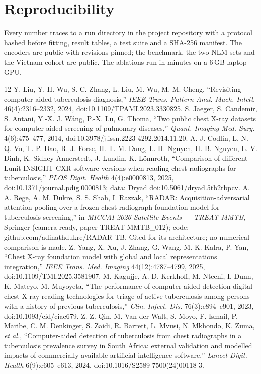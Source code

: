 \documentclass[11pt,a4paper]{article}
\begin{document}
\section*{Reproducibility}
Every number traces to a run directory in the project repository with a protocol hashed before fitting, result tables, a test suite and a SHA-256 manifest. The encoders are public with revisions pinned; the benchmark, the two NLM sets and the Vietnam cohort are public. The ablations run in minutes on a 6\,GB laptop GPU.

\begin{thebibliography}{12}\small
{} Y. Liu, Y.-H. Wu, S.-C. Zhang, L. Liu, M. Wu, M.-M. Cheng, ``Revisiting computer-aided tuberculosis diagnosis,'' \emph{IEEE Trans. Pattern Anal. Mach. Intell.} 46(4):2316--2332, 2024, doi:10.1109/TPAMI.2023.3330825.
 S. Jaeger, S. Candemir, S. Antani, Y.-X. J. W\'ang, P.-X. Lu, G. Thoma, ``Two public chest X-ray datasets for computer-aided screening of pulmonary diseases,'' \emph{Quant. Imaging Med. Surg.} 4(6):475--477, 2014, doi:10.3978/j.issn.2223-4292.2014.11.20.
 A. J. Codlin, L. N. Q. Vo, T. P. Dao, R. J. Forse, H. T. M. Dang, L. H. Nguyen, H. B. Nguyen, L. V. Dinh, K. Sidney Annerstedt, J. Lundin, K. L\"onnroth, ``Comparison of different Lunit INSIGHT CXR software versions when reading chest radiographs for tuberculosis,'' \emph{PLOS Digit. Health} 4(4):e0000813, 2025, doi:10.1371/journal.pdig.0000813; data: Dryad doi:10.5061/dryad.5tb2rbpcv.
 A. A. Rege, A. M. Dukre, S. S. Shah, I. Razzak, ``RADAR: Acquisition-adversarial attention pooling over a frozen chest-radiograph foundation model for tuberculosis screening,'' in \emph{MICCAI 2026 Satellite Events --- TREAT-MMTB}, Springer (camera-ready, paper TREAT-MMTB\_012); code: github.com/adinathdukre/RADAR-TB. Cited for its architecture; no numerical comparison is made.
 Z. Yang, X. Xu, J. Zhang, G. Wang, M. K. Kalra, P. Yan, ``Chest X-ray foundation model with global and local representations integration,'' \emph{IEEE Trans. Med. Imaging} 44(12):4787--4799, 2025, doi:10.1109/TMI.2025.3581907.
 M. Kagujje, A. D. Kerkhoff, M. Nteeni, I. Dunn, K. Mateyo, M. Muyoyeta, ``The performance of computer-aided detection digital chest X-ray reading technologies for triage of active tuberculosis among persons with a history of previous tuberculosis,'' \emph{Clin. Infect. Dis.} 76(3):e894--e901, 2023, doi:10.1093/cid/ciac679.
 Z. Z. Qin, M. Van der Walt, S. Moyo, F. Ismail, P. Maribe, C. M. Denkinger, S. Zaidi, R. Barrett, L. Mvusi, N. Mkhondo, K. Zuma, \emph{et al.}, ``Computer-aided detection of tuberculosis from chest radiographs in a tuberculosis prevalence survey in South Africa: external validation and modelled impacts of commercially available artificial intelligence software,'' \emph{Lancet Digit. Health} 6(9):e605--e613, 2024, doi:10.1016/S2589-7500(24)00118-3.

\end{thebibliography}
\end{document}
